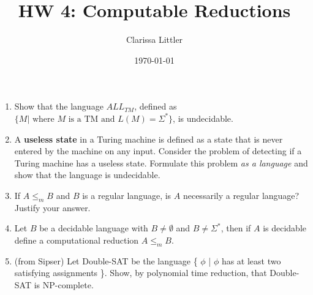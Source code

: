 \documentclass[11pt]{article}
\author{Clarissa Littler}
\date{\today}
\title{HW 4: Computable Reductions}
\begin{document}
\maketitle
\begin{enumerate}
\item Show that the language $ALL_{TM}$, defined as $\{M | \text{ where } M \text{ is a TM and } L(M) = \Sigma^*\}$, is undecidable.
\item A \textbf{useless state} in a Turing machine is defined as a state that is never entered by the machine on any input. Consider the problem of detecting if a Turing machine has a useless state. Formulate this problem \emph{as a language} and show that the language is undecidable.
\item If $A \le_m B$ and $B$ is a regular language, is $A$ necessarily a regular language? Justify your answer.
\item Let $B$ be a decidable language with $B \neq \emptyset$ and $B \neq \Sigma^*$, then if $A$ is decidable define a computational reduction $A \le_m B$.
\item (from Sipser) Let Double-SAT be the language \{ $\phi$ | $\phi$ has at least two satisfying assignments \}. Show, by polynomial time reduction, that Double-SAT is NP-complete.
\end{enumerate}
\end{document}
